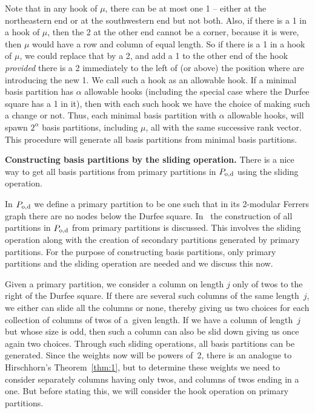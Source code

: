 \documentclass[pdftex]{sigma}
\numberwithin{equation}{section}
\theoremstyle{definition}
\begin{document}
Note that in any hook of $\mu$, there can be at most one 1 -- either at the
northeastern end or at the southwestern end but not both. Also, if there is
a 1 in a hook of $\mu$, then the 2 at the other end cannot be a corner, because
it is were, then $\mu$ would have a row and column of equal length. So if
there is a 1 in a hook of $\mu$, we could replace that by a 2, and add a 1
to the other end of the hook {\it provided} there is a 2 immediately
to the left of (or above) the position where are introducing the new 1. We call
such a hook as an allowable hook. If a minimal basis partition has $\alpha$
allowable hooks (including the special case where the Durfee square has a 1
in it), then with each such hook we have the choice of making such a change
or not. Thus, each minimal basis partition with $\alpha$ allowable hooks, will
spawn $2^{\alpha}$ basis partitions, including $\mu$, all with the same
successive rank vector. This procedure will generate all basis
partitions from minimal basis partitions.

{\bf Constructing basis partitions by the sliding operation.}
There is a nice way to get all basis partitions from primary partitions in
$P_{\rm o,d}$ using the sliding operation.

In $P_{\rm o,d}$ we define a primary partition to be one such that in its 2-modular
Ferrers graph there are no nodes below the Durfee square. In~\cite{Al2016} the
construction of all partitions in $P_{\rm o,d}$ from primary partitions is
discussed. This involves the sliding operation along with the creation of
secondary partitions generated by primary partitions. For the purpose
of constructing basis partitions, only primary partitions and the sliding
operation are needed and we discuss this now.

Given a primary partition, we consider a column on length $j$ only of twos
to the right of the Durfee square.
If there are several such columns of the same length~$j$, we either can slide
all the columns or none, thereby giving us two choices for each collection
of columns of twos of a~given length. If we have a column of length~$j$ but
whose
size is odd, then such a column can also be slid down giving us once again
two choices. Through such sliding operations, all basis partitions can be
generated. Since the weights now will be powers of~2, there is an analogue to
Hirschhorn's Theorem~\ref{thm:1},
but to determine these weights we need to consider separately columns
having only twos, and columns of twos ending in a one.
But before stating this, we will
consider the hook operation on primary partitions.
\end{document}
